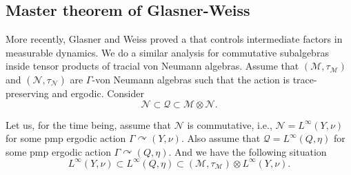 \documentclass[12pt]{amsart}
\theoremstyle{definition}
\begin{document}
\subsection{Master theorem of Glasner-Weiss}
More recently, Glasner and Weiss \cite{glasner2023intermediate} proved a  that controls intermediate factors in measurable dynamics. We do a similar analysis for commutative subalgebras inside tensor products of tracial von Neumann algebras. Assume that $(\mathcal{M},\tau_{\mathcal{M}})$ and $(\mathcal{N},\tau_{\mathcal{N}})$ are $\Gamma$-von Neumann algebras such that the action is trace-preserving and ergodic. 
Consider $$\mathcal{N}\subset\mathcal{Q}\subset\mathcal{M}\otimes\mathcal{N}.$$

Let us, for the time being, assume that $\mathcal{N}$ is commutative, i.e., $\mathcal{N}=L^{\infty}(Y,\nu)$ for some pmp ergodic action $\Gamma\curvearrowright (Y,\nu)$. Also assume that $\mathcal{Q}=L^{\infty}(Q,\eta)$ for some pmp ergodic action $\Gamma\curvearrowright (Q,\eta)$. 
And we have the following situation $$L^{\infty}(Y,\nu)\subset L^{\infty}(Q,\eta)\subset(\mathcal{M},\tau_{\mathcal{M}})\otimes L^{\infty}(Y,\nu).$$ 
\end{document}
